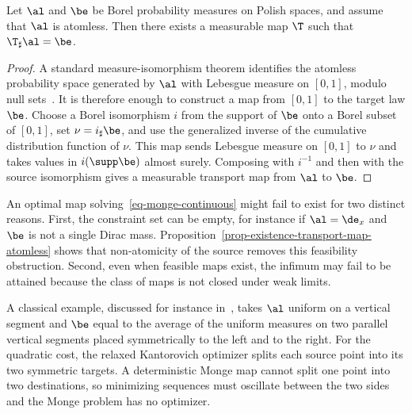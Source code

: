 \begin{prop}\label{prop-existence-transport-map-atomless}
	Let $\al$ and $\be$ be Borel probability measures on Polish spaces, and assume that $\al$ is atomless. Then there exists a measurable map $\T$ such that $\T_\sharp\al=\be$.
\end{prop}
\begin{proof}
	A standard measure-isomorphism theorem identifies the atomless probability space generated by $\al$ with Lebesgue measure on $[0,1]$, modulo null sets~\cite{bogachev2007measure}. It is therefore enough to construct a map from $[0,1]$ to the target law $\be$. Choose a Borel isomorphism $i$ from the support of $\be$ onto a Borel subset of $[0,1]$, set $\nu=i_\sharp\be$, and use the generalized inverse of the cumulative distribution function of $\nu$. This map sends Lebesgue measure on $[0,1]$ to $\nu$ and takes values in $i(\supp\be)$ almost surely. Composing with $i^{-1}$ and then with the source isomorphism gives a measurable transport map from $\al$ to $\be$.
\end{proof}

\begin{rem}
	An optimal map solving~\eqref{eq-monge-continuous} might fail to exist for two distinct reasons. First, the constraint set can be empty, for instance if $\al=\de_x$ and $\be$ is not a single Dirac mass. Proposition~\ref{prop-existence-transport-map-atomless} shows that non-atomicity of the source removes this feasibility obstruction. Second, even when feasible maps exist, the infimum may fail to be attained because the class of maps is not closed under weak limits.
\end{rem}

\begin{example}\label{ex-splitting-obstruction}
	A classical example, discussed for instance in~\cite{SantambrogioBook}, takes $\al$ uniform on a vertical segment and $\be$ equal to the average of the uniform measures on two parallel vertical segments placed symmetrically to the left and to the right. For the quadratic cost, the relaxed Kantorovich optimizer splits each source point into its two symmetric targets. A deterministic Monge map cannot split one point into two destinations, so minimizing sequences must oscillate between the two sides and the Monge problem has no optimizer.
\end{example}

